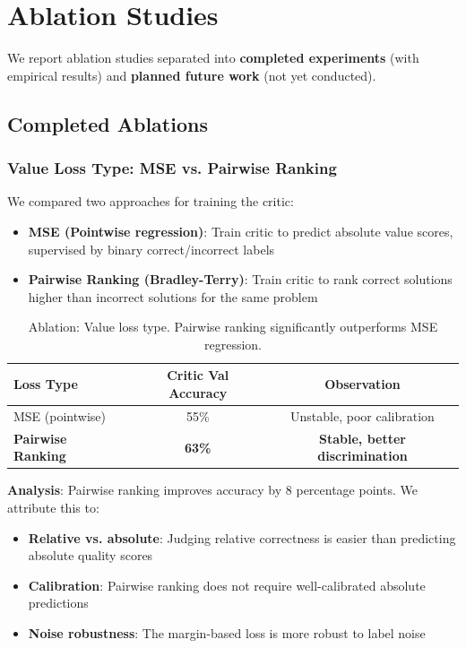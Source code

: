 \section{Ablation Studies}

We report ablation studies separated into \textbf{completed experiments} (with empirical results) and \textbf{planned future work} (not yet conducted).

\subsection{Completed Ablations}

\subsubsection{Value Loss Type: MSE vs. Pairwise Ranking}

We compared two approaches for training the critic:

\begin{itemize}[nosep]
    \item \textbf{MSE (Pointwise regression)}: Train critic to predict absolute value scores, supervised by binary correct/incorrect labels
    \item \textbf{Pairwise Ranking (Bradley-Terry)}: Train critic to rank correct solutions higher than incorrect solutions for the same problem
\end{itemize}

\begin{table}[h]
\centering
\caption{Ablation: Value loss type. Pairwise ranking significantly outperforms MSE regression.}
\label{tab:ablation_loss}
\begin{tabular}{lcc}
\toprule
\textbf{Loss Type} & \textbf{Critic Val Accuracy} & \textbf{Observation} \\
\midrule
MSE (pointwise) & 55\% & Unstable, poor calibration \\
\textbf{Pairwise Ranking} & \textbf{63\%} & \textbf{Stable, better discrimination} \\
\bottomrule
\end{tabular}
\end{table}

\textbf{Analysis}: Pairwise ranking improves accuracy by 8 percentage points. We attribute this to:
\begin{itemize}[nosep]
    \item \textbf{Relative vs. absolute}: Judging relative correctness is easier than predicting absolute quality scores
    \item \textbf{Calibration}: Pairwise ranking does not require well-calibrated absolute predictions
    \item \textbf{Noise robustness}: The margin-based loss is more robust to label noise
\end{itemize}

